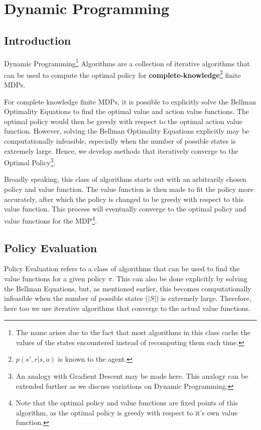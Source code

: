 \documentclass[12pt]{report}
\begin{document}
\chapter{Dynamic Programming}
\section{Introduction}
Dynamic Programming\footnote{The name arises due to the fact that most algorithms in this class cache the values of the states encountered instead of recomputing them each time.} Algorithms are a collection of iterative algorithms that can be used to compute the optimal policy for \textbf{complete-knowledge}\footnote{$p(s', r | s, a)$ is known to the agent.} finite MDPs. 

For complete knowledge finite MDPs, it is possible to explicitly solve the Bellman Optimality Equations to find the optimal value and action value functions. The optimal policy would then be greedy with respect to 
the optimal action value function. However, solving the Bellman Optimality Equations explicitly may be computationally infeasible, especially when the number of possible states is extremely large. Hence, we develop 
methods that iteratively converge to the Optimal Policy\footnote{An analogy with Gradient Descent may be made here. This analogy can be extended further as we discuss variations on Dynamic Programming.}.

Broadly speaking, this class of algorithms starts out with an arbitrarily chosen policy and value function. The value function is then made to fit the policy more accurately, after which the policy is changed to be 
greedy with respect to this value function. This process will eventually converge to the optimal policy and value functions for the MDP\footnote{Note that the optimal policy and value functions are fixed points of this algorithm, as the optimal policy is greedy with respect to it's own value function.}.

\section{Policy Evaluation}
Policy Evaluation refers to a class of algorithms that can be used to find the value functions for a given policy $\pi$. This can also be done explicitly by solving the Bellman Equations, but, as mentioned earlier, this becomes 
computationally infeasible when the number of possible states ($\left|S\right|$) is extremely large. Therefore, here too we use iterative algorithms that converge to the actual value functions.
\end{document}
